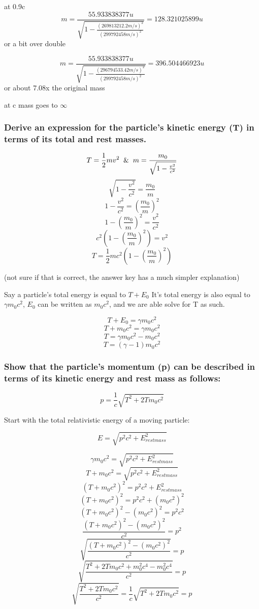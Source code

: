 \documentclass{article}
\begin{document}
at 0.9c
$$m = \frac{55.933838377u}{\sqrt{1-\frac{(269813212.2m/s)^2}{(299792458m/s)^2}}}=128.321025899u$$ or a bit over double\vspace{10pt}


$$m = \frac{55.933838377u}{\sqrt{1-\frac{(296794533.42m/s)^2}{(299792458m/s)^2}}}=396.504466923u$$ or about 7.08x the original mass\vspace{10pt}

at c mass goes to $\infty$


\subsubsection{ Derive an expression for the particle’s kinetic energy (T) in terms of its total and rest
masses.}\vspace{10pt
}

$$T=\frac{1}{2}mv^2 \And m = \frac{m_0}{\sqrt{1-\frac{v^2}{c^2}}}$$
$$\sqrt{1-\frac{v^2}{c^2}} = \frac{m_0}{m}$$
$$1-\frac{v^2}{c^2} = (\frac{m_0}{m})^2$$
$$1-(\frac{m_0}{m})^2 = \frac{v^2}{c^2}$$
$$c^2(1-(\frac{m_0}{m})^2) = v^2$$
$$T=\frac{1}{2}mc^2(1-(\frac{m_0}{m})^2)$$

(not sure if that is correct, the answer key has a much simpler explanation)\vspace{10pt}

Say a particle's total energy is equal to $T+E_0$ It's total energy is also equal to $\gamma m_0c^2$, $E_0$ can be written as $m_0c^2$, and we are able solve for T as such. \vspace{10pt}

$$T+E_0=\gamma m_0c^2$$
$$T+m_0c^2=\gamma m_0c^2$$
$$T=\gamma m_0c^2-m_0c^2$$
$$T=(\gamma-1)m_0c^2$$

\subsubsection{Show that the particle’s momentum (p) can be described in terms of its kinetic energy
and rest mass as follows:}

$$p = \frac{1}{c}\sqrt{T^2 + 2Tm_0c^2}$$

Start with the total relativistic energy of a moving particle:

$$ E=\sqrt{p^2c^2+E^2_{rest mass}}$$

$$ \gamma m_0c^2=\sqrt{p^2c^2+E^2_{rest mass}}$$
$$ T + m_0c^2=\sqrt{p^2c^2+E^2_{rest mass}}$$
$$ (T + m_0c^2)^2=p^2c^2+E^2_{rest mass}$$
$$ (T + m_0c^2)^2=p^2c^2+(m_0c^2)^2$$
$$ (T + m_0c^2)^2-(m_0c^2)^2=p^2c^2$$
$$ \frac{(T + m_0c^2)^2-(m_0c^2)^2}{c^2}=p^2$$
$$ \sqrt{\frac{(T + m_0c^2)^2-(m_0c^2)^2}{c^2}}=p$$
$$ \sqrt{\frac{T^2 + 2Tm_0c^2+m_0^2c^4-m_0^2c^4}{c^2}}=p$$
$$ \sqrt{\frac{T^2 + 2Tm_0c^2}{c^2}}= \frac{1}{c}\sqrt{T^2 + 2Tm_0c^2} = p$$
\end{document}
